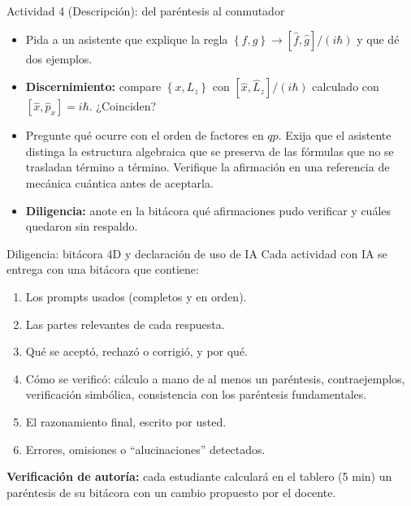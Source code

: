 \documentclass[spanish]{beamer}
\newcommand{\pb}[2]{\left\{#1,#2\right\}}   %
\begin{document}
\begin{frame}{Actividad 4 (Descripción): del paréntesis al conmutador}
\begin{itemize}
  \item<1-> Pida a un asistente que explique la regla
        $\pb{f}{g}\to [\hat f,\hat g]/(i\hbar)$ y que dé dos ejemplos.
  \item<2-> \textbf{Discernimiento:} compare $\pb{x}{L_z}$ con
        $[\hat x,\hat L_z]/(i\hbar)$ calculado con $[\hat x,\hat p_x] = i\hbar$.
        ¿Coinciden?
  \item<3-> Pregunte qué ocurre con el orden de factores en $qp$. Exija que el
        asistente distinga la estructura algebraica que se preserva de las
        fórmulas que no se trasladan término a término. Verifique la afirmación en una
        referencia de mecánica cuántica antes de aceptarla.
  \item<4-> \textbf{Diligencia:} anote en la bitácora qué afirmaciones pudo verificar y
        cuáles quedaron sin respaldo.
\end{itemize}
\end{frame}

\begin{frame}{Diligencia: bitácora 4D y declaración de uso de IA}
Cada actividad con IA se entrega con una bitácora que contiene:
\begin{enumerate}
  \item Los prompts usados (completos y en orden).
  \item Las partes relevantes de cada respuesta.
  \item Qué se aceptó, rechazó o corrigió, y por qué.
  \item Cómo se verificó: cálculo a mano de al menos un paréntesis, contraejemplos,
        verificación simbólica, consistencia con los paréntesis fundamentales.
  \item El razonamiento final, escrito por usted.
  \item Errores, omisiones o ``alucinaciones'' detectados.
\end{enumerate}
\vspace{0.2cm}
\textbf{Verificación de autoría:} cada estudiante calculará en el tablero (5 min) un
paréntesis de su bitácora con un cambio propuesto por el docente.
\end{frame}

\end{document}
